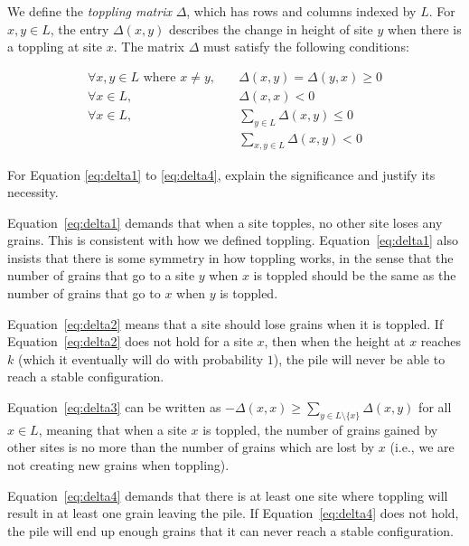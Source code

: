 We define the \emph{toppling matrix} $\Delta$, which has rows and columns indexed by $L$. For $x,y\in L$, the entry $\Delta(x,y)$ describes the change in height of site $y$ when there is a toppling at site $x$. The matrix $\Delta$ must satisfy the following conditions:

\begin{align}
    \forall x,y\in L \text{ where } x\ne y, \quad &\Delta(x,y)=\Delta(y,x) \ge 0 \label{eq:delta1} \\
    \forall x\in L, \quad & \Delta(x,x) < 0 \label{eq:delta2}\\
    \forall x\in L, \quad & \sum_{y\in L}\Delta(x,y) \le 0 \label{eq:delta3}\\
    & \sum_{x,y\in L}\Delta(x,y) < 0 \label{eq:delta4}
\end{align}



\begin{question}
    For Equation \ref{eq:delta1} to \ref{eq:delta4}, explain the significance and justify its necessity.
\end{question}

Equation~\ref{eq:delta1} demands that when a site topples, no other site loses any grains. This is consistent with how we defined toppling. Equation~\ref{eq:delta1} also insists that there is some symmetry in how toppling works, in the sense that the number of grains that go to a site $y$ when $x$ is toppled should be the same as the number of grains that go to $x$ when $y$ is toppled. 

Equation~\ref{eq:delta2} means that a site should lose grains when it is toppled. If Equation~\ref{eq:delta2} does not hold for a site $x$, then when the height at $x$ reaches $k$ (which it eventually will do with probability $1$), the pile will never be able to reach a stable configuration. 

Equation~\ref{eq:delta3} can be written as $-\Delta(x,x) \ge \sum_{y\in L\setminus \{x\}}\Delta(x,y)$ for all $x\in L$, meaning that when a site $x$ is toppled, the number of grains gained by other sites is no more than the number of grains which are lost by $x$ (i.e., we are not creating new grains when toppling). 

Equation~\ref{eq:delta4} demands that there is at least one site where toppling will result in at least one grain leaving the pile. If Equation~\ref{eq:delta4} does not hold, the pile will end up enough grains that it can never reach a stable configuration. 

